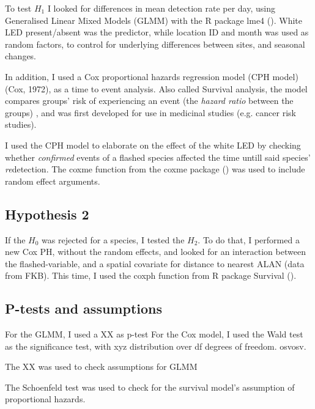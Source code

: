 To test $H_{1}$ I looked for differences in mean detection rate per day, using Generalised Linear Mixed Models (GLMM) with the R package lme4 (\cite{lme4}). White LED present/absent was the predictor, while location ID and month was used as random factors, to control for underlying differences between sites, and seasonal changes.



In addition, I used a Cox proportional hazards regression model (CPH model) (Cox, 1972), as a time to event analysis. 
Also called Survival analysis, the model compares groups' risk of experiencing an event (the \emph{hazard ratio} between the groups) , and was first developed for use in medicinal studies (e.g. cancer risk studies).

I used the CPH model to elaborate on the effect of the white LED by checking whether \emph{confirmed} events of a flashed species affected the time untill said species' \emph{re}detection. The coxme function from the coxme package (\cite{coxme-package}) was used to include random effect arguments.


	\subsection*{Hypothesis 2}

If the $H_{0}$ was rejected for a species, I tested the $H_{2}$.
To do that, I performed a new Cox PH, without the random effects, and looked for an interaction between the flashed-variable, and a spatial covariate for distance to nearest ALAN 
(data from FKB). %
This time, I used the coxph function from R package Survival (\cite{survival-package}).


	\subsection*{P-tests and assumptions}

For the GLMM, I used a XX as p-test 
For the Cox model, I used the Wald test as the significance test, with xyz distribution over df degrees of freedom. osvosv. 


The XX was used to check assumptions for GLMM  %

The Schoenfeld test was used to check for the survival model's assumption of proportional hazards. 





